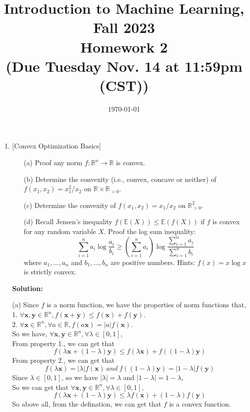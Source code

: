 \documentclass[10pt]{article}
\begin{document}
\date{\today}
\title{Introduction to Machine Learning, Fall 2023 \\
	Homework 2\\
	\small (Due Tuesday Nov. 14 at 11:59pm (CST))}
\maketitle

\begin{enumerate}[1.]


	\item {} [Convex Optimization Basics]
	      \begin{itemize}
		      \item[(a)] Proof any norm $f:\mathbb{R}^{n}\rightarrow\mathbb{R}$ is convex.~
		      \item[(b)] Determine the convexity (i.e., convex, concave or neither) of $f(x_1,x_2)=x_1^2/x_2$ on $\mathbb{R}\times\mathbb{R}_{>0}$.~
		      \item[(c)] Determine the convexity of $f(x_1,x_2)=x_1/x_2$ on $\mathbb{R}_{>0}^{2}$.~
			  \item[(d)] Recall Jensen's inequality $f(\mathbb{E}(X)) \leq \mathbb{E}(f(X))$ if $f$ is convex for any random variable $X$. 
			  Proof the log sum inequality: 
			  \[
				\sum_{i=1}^{n} a_i \log \frac{a_i}{b_i} \geq \left( \sum_{i=1}^{n} a_i\right) \log \frac{\sum_{i=1}^{n} a_i}{\sum_{i=1}^{n} b_i} 
			  \]
			  where $a_1,\ldots,a_n$ and $b_1,\ldots,b_n$ are positive numbers. Hints: $f(x)=x\log x$ is strictly convex.~
	      \end{itemize}

		  \textbf{Solution:}

 		  (a) Since $f$ is a norm function, we have the properties of norm functions that,\\
		  1. $\forall \mathbf{x},\mathbf{y}\in \mathbb{R}^{n}, f(\mathbf{x}+\mathbf{y})\leq f(\mathbf{x})+f(\mathbf{y})$.\\
		  2. $\forall \mathbf{x}\in \mathbb{R}^{n}, \forall a \in \mathbb{R}, f(a\mathbf{x})=|a|f(\mathbf{x})$.\\
		  So we have, $\forall \mathbf{x},\mathbf{y}\in \mathbb{R}^{n}, \forall \lambda \in [0,1]$,\\
		  From property 1., we can get that 
		  $$f(\lambda \mathbf{x}+(1-\lambda)\mathbf{y})\leq f(\lambda \mathbf{x})+f((1-\lambda)\mathbf{y})$$
		  From property 2., we can get that
		  $$f(\lambda \mathbf{x})=|\lambda|f(\mathbf{x})\ and\ f((1-\lambda)\mathbf{y})=|1-\lambda|f(\mathbf{y})$$
		  Since $\lambda \in [0,1]$, so we have $|\lambda|=\lambda$ and $|1-\lambda|=1-\lambda$,\\
		  So we can get that $\forall \mathbf{x},\mathbf{y}\in \mathbb{R}^{n}, \forall \lambda \in [0,1]$,
		  $$f(\lambda \mathbf{x}+(1-\lambda)\mathbf{y})\leq \lambda f(\mathbf{x})+(1-\lambda)f(\mathbf{y})$$
		  So above all, from the defination, we can get that $f$ is a convex function.


\end{enumerate}
\end{document}
